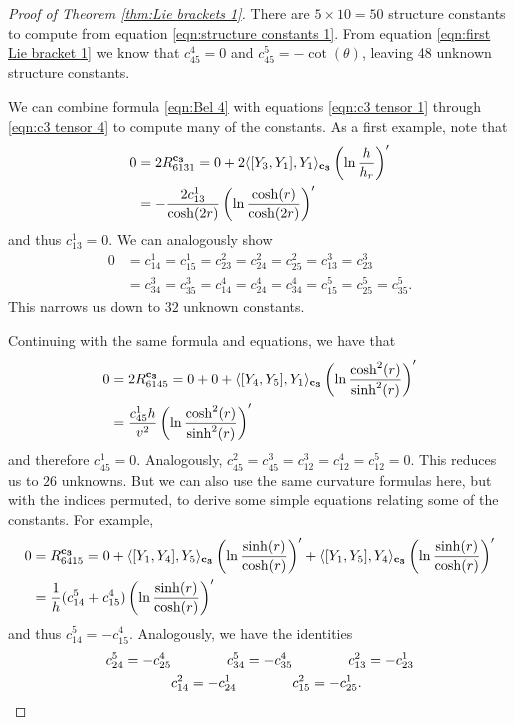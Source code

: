 \documentclass[10pt]{amsart}
\def\la{\langle}
\def\ra{\rangle}
\def\th{\theta}
\theoremstyle{definition}
\theoremstyle{remark}
\numberwithin{equation}{section}
\begin{document}
\begin{proof}[Proof of Theorem \ref{thm:Lie brackets 1}]
There are $5 \times 10 = 50$ structure constants to compute from equation \eqref{eqn:structure constants 1}.  
From equation \eqref{eqn:first Lie bracket 1} we know that $c_{45}^4 = 0$ and $c_{45}^5 = - \cot(\th)$, leaving 48 unknown structure constants.

We can combine formula \eqref{eqn:Bel 4} with equations \eqref{eqn:c3 tensor 1} through \eqref{eqn:c3 tensor 4} to compute many of the constants.  
As a first example, note that
	\begin{align*}
	0 &= 2R^{\bf c_3}_{6131} = 0 + 2 \la [Y_3,Y_1],Y_1 \ra_{\bf c_3} \left( \ln \frac{h}{h_r} \right)'  \\
	&= - \frac{2 c_{13}^1}{\cosh(2r)} \left( \ln \frac{\cosh(r)}{\cosh(2r)} \right)'  \\
	\end{align*}
and thus $c_{13}^1 = 0$.  
We can analogously show
	\begin{align*}
	0 &= c_{14}^1 = c_{15}^1 = c_{23}^2 = c_{24}^2 = c_{25}^2 = c_{13}^3 = c_{23}^3  \\
	&= c_{34}^3 = c_{35}^3 = c_{14}^4 = c_{24}^4 = c_{34}^4 = c_{15}^5 = c_{25}^5 = c_{35}^5.
	\end{align*}
This narrows us down to $32$ unknown constants.  

Continuing with the same formula and equations, we have that
	\begin{align*}
	0 &= 2R^{\bf c_3}_{6145} = 0  + 0 + \la [Y_4,Y_5],Y_1 \ra_{\bf c_3} \left( \ln \frac{\cosh^2(r)}{\sinh^2(r)} \right)'  \\
	&= \frac{c_{45}^1 h}{v^2} \left( \ln \frac{\cosh^2(r)}{\sinh^2(r)} \right)'
	\end{align*}
and therefore $c_{45}^1 = 0$.  
Analogously, $c_{45}^2 = c_{45}^3 = c_{12}^3 = c_{12}^4 = c_{12}^5 = 0$.  
This reduces us to $26$ unknowns.  
But we can also use the same curvature formulas here, but with the indices permuted, to derive some simple equations relating some of the constants.  
For example,
	\begin{align*}
	0 &= R^{\bf c_3}_{6415} = 0 + \la [Y_1,Y_4],Y_5 \ra_{\bf c_3} \left( \ln \frac{\sinh(r)}{\cosh(r)} \right)' + \la [Y_1,Y_5],Y_4 \ra_{\bf c_3} \left( \ln \frac{\sinh(r)}{\cosh(r)} \right)'  \\
	&= \frac{1}{h} (c_{14}^5 + c_{15}^4) \left( \ln \frac{\sinh(r)}{\cosh(r)} \right)'
	\end{align*}
and thus $c_{14}^5 = - c_{15}^4$.  
Analogously, we have the identities
	\begin{align*}
	c_{24}^5 = -c_{25}^4	&	\hskip 40pt	c_{34}^5 = - c_{35}^4	\hskip 40pt	c_{13}^2 = -c_{23}^1  \\
	&c_{14}^2 = - c_{24}^1	\hskip 40pt	c_{15}^2 = - c_{25}^1.
	\end{align*}
	

\end{proof}
\end{document}
